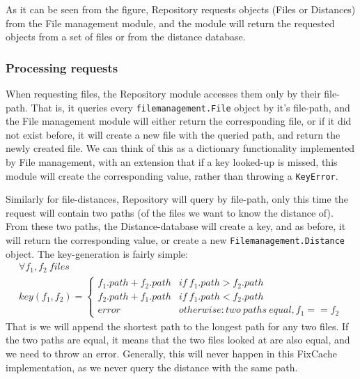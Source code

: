 \documentclass[12pt,twoside,notitlepage]{report}
\newcommand{\fxch}{FixCache}
\begin{document}
As it can be seen from the figure, Repository requests objects (Files or Distances) from the File management module, and the module will return the requested objects from a set of files or from the distance database.
\subsubsection*{Processing requests}
When requesting files, the Repository module accesses them only by their file-path. That is, it queries every \texttt{filemanagement.File} object by it's file-path, and the File management module will either return the corresponding file, or if it did not exist before, it will create a new file with the queried path, and return the newly created file. We can think of this as a dictionary functionality implemented by File management, with an extension that if a key looked-up is missed, this module will create the corresponding value, rather than throwing a \texttt{KeyError}.

Similarly for file-distances, Repository will query by file-path, only this time the request will contain two paths (of the files we want to know the distance of). From these two paths, the Distance-database will create a key, and as before, it will return the corresponding value, or create a new \texttt{Filemanagement.Distance} object. The key-generation is fairly simple:
\begin{gather*}\label{distance_key} 
	\forall f_1, f_2\ files \\
	key(f_1, f_2) = \begin{cases}
						f_1.path+f_2.path &if\ f_1.path > f_2.path\\
						f_2.path+f_1.path &if\ f_1.path < f_2.path\\
						error &otherwise: two\ paths\ equal, f_1 == f_2
					\end{cases}
\end{gather*}
That is we will append the shortest path to the longest path for any two files. If the two paths are equal, it means that the two files looked at  are also equal, and we need to throw an error. Generally, this will never happen in this \fxch{} implementation, as we never query the distance with the same path.
\end{document}
